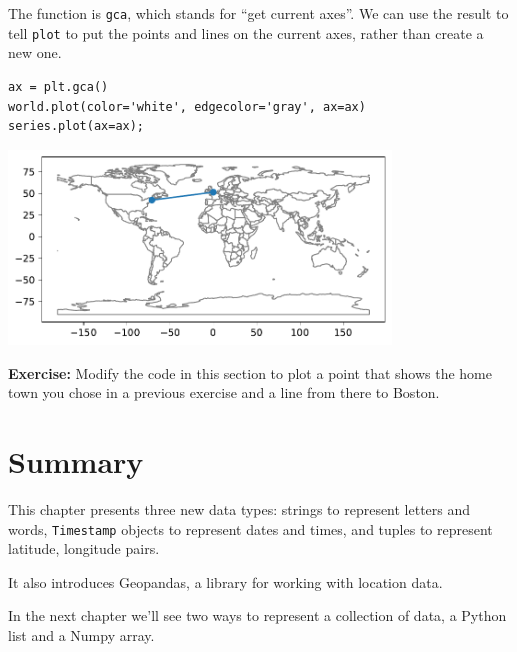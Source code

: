 The function is \passthrough{\lstinline!gca!}, which stands for ``get
current axes''. We can use the result to tell
\passthrough{\lstinline!plot!} to put the points and lines on the
current axes, rather than create a new one.

\begin{lstlisting}[]
ax = plt.gca()
world.plot(color='white', edgecolor='gray', ax=ax)
series.plot(ax=ax);
\end{lstlisting}

\begin{center}
\includegraphics[width=4in]{chapters/02_times_files/02_times_130_0.pdf}
\end{center}

\textbf{Exercise:} Modify the code in this section to plot a point that
shows the home town you chose in a previous exercise and a line from
there to Boston.

\hypertarget{summary}{%
\section{Summary}\label{summary}}

This chapter presents three new data types: strings to represent letters
and words, \passthrough{\lstinline!Timestamp!} objects to represent
dates and times, and tuples to represent latitude, longitude pairs.

It also introduces Geopandas, a library for working with location data.

In the next chapter we'll see two ways to represent a collection of
data, a Python list and a Numpy array.

